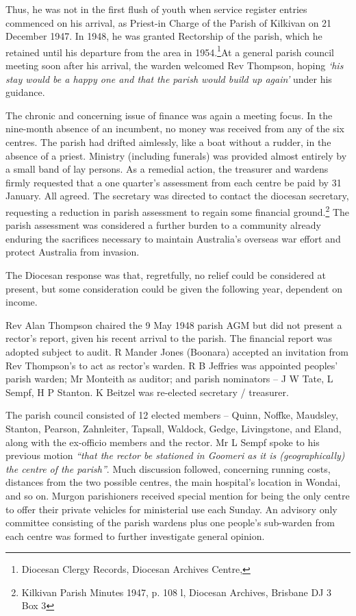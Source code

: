 Thus, he was not in the first flush of youth when service register entries commenced on his arrival, as Priest-in Charge of the Parish of Kilkivan on 21 December 1947. In 1948, he was granted Rectorship of the parish, which he retained until his departure from the area in 1954.\footnote{Diocesan Clergy Records, Diocesan Archives Centre,}At a general parish council meeting soon after his arrival, the warden welcomed Rev Thompson, hoping \emph{`his stay would be a happy one and that the parish would build up again'} under his guidance.

The chronic and concerning issue of finance was again a meeting focus. In the nine-month absence of an incumbent, no money was received from any of the six centres. The parish had drifted aimlessly, like a boat without a rudder, in the absence of a priest. Ministry (including funerals) was provided almost entirely by a small band of lay persons. As a remedial action, the treasurer and wardens firmly requested that a one quarter's assessment from each centre be paid by 31 January. All agreed. The secretary was directed to contact the diocesan secretary, requesting a reduction in parish assessment to regain some financial ground.\footnote{Kilkivan Parish Minutes 1947, p. 108 l, Diocesan Archives, Brisbane DJ 3 Box 3} The parish assessment was considered a further burden to a community already enduring the sacrifices necessary to maintain Australia's overseas war effort and protect Australia from invasion.

The Diocesan response was that, regretfully, no relief could be considered at present, but some consideration could be given the following year, dependent on income.

Rev Alan Thompson chaired the 9 May 1948 parish AGM but did not present a rector's report, given his recent arrival to the parish. The financial report was adopted subject to audit. R Mander Jones (Boonara) accepted an invitation from Rev Thompson's to act as rector's warden. R B Jeffries was appointed peoples' parish warden; Mr Monteith as auditor; and parish nominators -- J W Tate, L Sempf, H P Stanton. K Beitzel was re-elected secretary / treasurer.

The parish council consisted of 12 elected members -- Quinn, Noffke, Maudsley, Stanton, Pearson, Zahnleiter, Tapsall, Waldock, Gedge, Livingstone, and Eland, along with the ex-officio members and the rector. Mr L Sempf spoke to his previous motion \emph{``that the rector be stationed in Goomeri as it is (geographically) the centre of the parish''}. Much discussion followed, concerning running costs, distances from the two possible centres, the main hospital's location in Wondai, and so on. Murgon parishioners received special mention for being the only centre to offer their private vehicles for ministerial use each Sunday. An advisory only committee consisting of the parish wardens plus one people's sub-warden from each centre was formed to further investigate general opinion.

